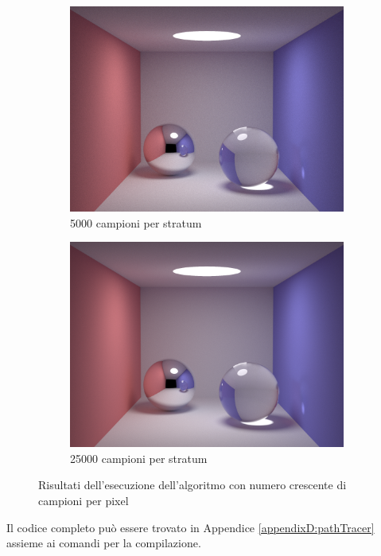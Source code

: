\begin{figure}[p]
\begin{subfigure}[c]{0.4\linewidth}
	\includegraphics[width=\linewidth]{../assets/appendixD_result_5k.png}
	\caption{5000 campioni per stratum}
    \end{subfigure}\hfill
    \begin{subfigure}[c]{0.4\linewidth}
	\centering
	\includegraphics[width=\linewidth]{../assets/appendixD_result_25k.png}
	\caption{25000 campioni per stratum}
    \end{subfigure}
    \caption{Risultati dell'esecuzione dell'algoritmo con numero crescente di campioni per pixel}
	\label{chapter8:LT:results}
\end{figure}
Il codice completo pu\`o essere trovato in Appendice \ref{appendixD:pathTracer} assieme ai comandi per la compilazione.
